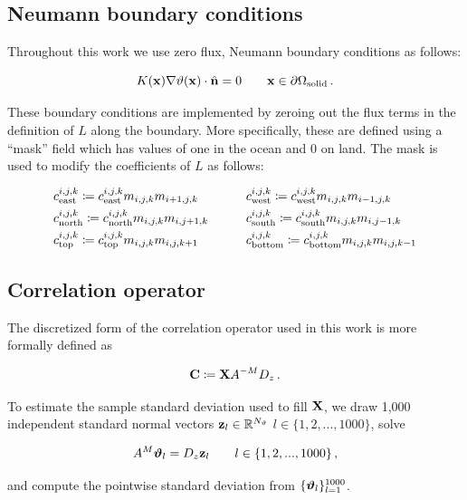\subsection{Neumann boundary conditions}
\label{ssec:boundary_conditions}

Throughout this work we use zero flux, Neumann boundary conditions as follows:
\begin{linenomath*}\begin{equation*}
    K(\mathbf{x})\nabla\vartheta(\mathbf{x}) \cdot \hat{\mathbf{n}} = 0 \qquad \mathbf{x}\in\partial\Omega_{\text{solid}} \, .
\end{equation*}\end{linenomath*}
These boundary conditions are implemented by zeroing out the flux terms in the
definition of $L$ along the boundary.
More specifically, these are defined using a ``mask'' field which has
values of one in the ocean and 0 on land.
The mask is used to modify the coefficients of $L$ as follows:
\begin{linenomath*}\begin{equation*}
    \begin{aligned}
        &c_\text{east}^{i,j,k} \coloneqq c_\text{east}^{i,j,k}
            m_{{i,j,k}} m_{{i+1,j,k}}
        \qquad
        &&c_\text{west}^{i,j,k} \coloneqq c_\text{west}^{i,j,k}
            m_{{i,j,k}} m_{{i-1,j,k}}
        \\
        &c_\text{north}^{i,j,k} \coloneqq c_\text{north}^{i,j,k}
            m_{{i,j,k}} m_{{i,j+1,k}}
        \qquad
        &&c_\text{south}^{i,j,k} \coloneqq c_\text{south}^{i,j,k}
            m_{{i,j,k}} m_{{i,j-1,k}}
        \\
        &c_\text{top}^{i,j,k} \coloneqq c_\text{top}^{i,j,k}
            m_{{i,j,k}} m_{{i,j,k+1}}
        \qquad
        &&c_\text{bottom}^{i,j,k} \coloneqq c_\text{bottom}^{i,j,k}
            m_{{i,j,k}} m_{{i,j,k-1}}
    \end{aligned}
\end{equation*}\end{linenomath*}

\subsection{Correlation operator}
\label{ssec:correlation_fv}

The discretized form of the correlation operator used in this work is more
formally defined as
\begin{linenomath*}\begin{equation}
    \mathbf{C} \coloneqq \mathbf{X} A^{-M} D_z \, .
    \label{eq:corr_operator_fv}
\end{equation}\end{linenomath*}
To estimate the sample standard deviation used to fill $\mathbf{X}$, we
draw 1,000 independent standard normal vectors $\mathbf{z}_{l} \in \mathbb{R}^{N_{\vartheta}}$
$l\in \{1, 2, ..., 1000\}$, solve
\begin{linenomath*}\begin{equation}
    A^{M} \bm{\vartheta}_{l} = D_z \mathbf{z}_{l} \qquad l \in \{1, 2, ..., 1000\} \, ,
    \label{eq:sampling}
\end{equation}\end{linenomath*}
and compute the pointwise standard deviation from $\{\bm{\vartheta}_{l}\}_{l=1}^{1000}$.

